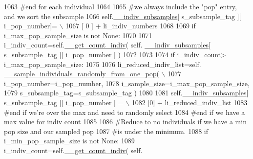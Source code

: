 \begin{DoxyCode}
1063             \textcolor{comment}{#end for each individual}
1064 
1065             \textcolor{comment}{#we always include the "pop" entry, and we sort the subsample}
1066             self.\hyperlink{classnegui_1_1genepopfilemanager_1_1GenepopFileManager_a1e8379bcee4902ca9314ff53fcb71644}{\_\_indiv\_subsamples}[ s\_subsample\_tag ][ i\_pop\_number]= \(\backslash\)
1067                                                  [ 0 ] +  li\_indiv\_numbers
1068 
1069             \textcolor{keywordflow}{if} i\_max\_pop\_sample\_size \textcolor{keywordflow}{is} \textcolor{keywordflow}{not} \textcolor{keywordtype}{None}:
1070 
1071                 i\_indiv\_count=self.\hyperlink{classnegui_1_1genepopfilemanager_1_1GenepopFileManager_ac7cc98fe56efee82b4ffd4dc816a4704}{\_\_get\_count\_indiv}( self.
      \hyperlink{classnegui_1_1genepopfilemanager_1_1GenepopFileManager_a1e8379bcee4902ca9314ff53fcb71644}{\_\_indiv\_subsamples}[ s\_subsample\_tag ][ i\_pop\_number ] )
1072 
1073                 
1074                 \textcolor{keywordflow}{if} i\_indiv\_count> i\_max\_pop\_sample\_size:
1075 
1076                     li\_reduced\_indiv\_list=self.
      \hyperlink{classnegui_1_1genepopfilemanager_1_1GenepopFileManager_a9818467c9cb40f8e1de0c6cc7f52e263}{\_\_sample\_individuals\_randomly\_from\_one\_pop}( \(\backslash\)
1077                                                             i\_pop\_number=i\_pop\_number,
1078                                                             i\_sample\_size=i\_max\_pop\_sample\_size,
1079                                                             s\_subsample\_tag=s\_subsample\_tag )
1080 
1081                     self.\hyperlink{classnegui_1_1genepopfilemanager_1_1GenepopFileManager_a1e8379bcee4902ca9314ff53fcb71644}{\_\_indiv\_subsamples}[ s\_subsample\_tag ][ i\_pop\_number ] = \(\backslash\)
1082                                                         [0] + li\_reduced\_indiv\_list
1083                 \textcolor{comment}{#end if we're over the max and need to randomly select}
1084             \textcolor{comment}{#end if we have a max value for indiv count}
1085 
1086             \textcolor{comment}{#Reduce to no individuals if we have a min pop size and our sampled pop}
1087             \textcolor{comment}{#is under the minimum.}
1088             \textcolor{keywordflow}{if} i\_min\_pop\_sample\_size \textcolor{keywordflow}{is} \textcolor{keywordflow}{not} \textcolor{keywordtype}{None}:
1089                 i\_indiv\_count=self.\hyperlink{classnegui_1_1genepopfilemanager_1_1GenepopFileManager_ac7cc98fe56efee82b4ffd4dc816a4704}{\_\_get\_count\_indiv}( self.

\end{DoxyCode}
